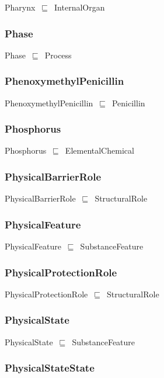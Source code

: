 \documentclass{article}
\begin{document}
Pharynx~\ensuremath{\sqsubseteq}~InternalOrgan~

\subsubsection*{Phase}

Phase~\ensuremath{\sqsubseteq}~Process~

\subsubsection*{PhenoxymethylPenicillin}

PhenoxymethylPenicillin~\ensuremath{\sqsubseteq}~Penicillin~

\subsubsection*{Phosphorus}

Phosphorus~\ensuremath{\sqsubseteq}~ElementalChemical~

\subsubsection*{PhysicalBarrierRole}

PhysicalBarrierRole~\ensuremath{\sqsubseteq}~StructuralRole~

\subsubsection*{PhysicalFeature}

PhysicalFeature~\ensuremath{\sqsubseteq}~SubstanceFeature~

\subsubsection*{PhysicalProtectionRole}

PhysicalProtectionRole~\ensuremath{\sqsubseteq}~StructuralRole~

\subsubsection*{PhysicalState}

PhysicalState~\ensuremath{\sqsubseteq}~SubstanceFeature~

\subsubsection*{PhysicalStateState}
\end{document}

